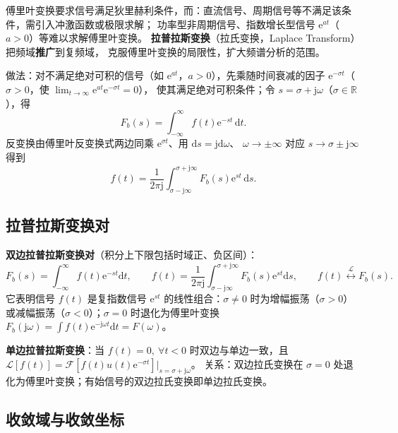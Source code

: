 傅里叶变换要求信号满足狄里赫利条件，而：直流信号、周期信号等不满足该条件，需引入冲激函数或极限求解；
功率型非周期信号、指数增长型信号 $\mathrm{e}^{at}$（$a>0$）等难以求解傅里叶变换。
\textbf{拉普拉斯变换}（拉氏变换，Laplace Transform）把频域\textbf{推广}到复频域，
克服傅里叶变换的局限性，扩大频谱分析的范围。

做法：对不满足绝对可积的信号（如 $\mathrm{e}^{at}$，$a>0$），先乘随时间衰减的因子
$\mathrm{e}^{-\sigma t}$（$\sigma>0$，使 $\lim_{t\to\infty}\mathrm{e}^{at}\mathrm{e}^{-\sigma t}=0$），
使其满足绝对可积条件；令 $s=\sigma+\mathrm{j}\omega$（$\sigma\in\mathbb{R}$），得
\begin{equation}
F_b(s)=\int_{-\infty}^{\infty}f(t)\mathrm{e}^{-st}\,\mathrm{d}t .
\end{equation}
反变换由傅里叶反变换式两边同乘 $\mathrm{e}^{\sigma t}$、用 $\mathrm{d}s=\mathrm{j}\mathrm{d}\omega$、
$\omega\to\pm\infty$ 对应 $s\to\sigma\pm\mathrm{j}\infty$ 得到
\begin{equation}
f(t)=\frac{1}{2\pi\mathrm{j}}\int_{\sigma-\mathrm{j}\infty}^{\sigma+\mathrm{j}\infty}F_b(s)\mathrm{e}^{st}\,\mathrm{d}s .
\end{equation}

\subsection{拉普拉斯变换对}

\textbf{双边拉普拉斯变换对}（积分上下限包括时域正、负区间）：
\begin{equation}
F_b(s)=\int_{-\infty}^{\infty}f(t)\mathrm{e}^{-st}\mathrm{d}t,\qquad
f(t)=\frac{1}{2\pi\mathrm{j}}\int_{\sigma-\mathrm{j}\infty}^{\sigma+\mathrm{j}\infty}F_b(s)\mathrm{e}^{st}\mathrm{d}s,
\qquad f(t)\overset{\mathcal{L}}{\longleftrightarrow}F_b(s).
\end{equation}
它表明信号 $f(t)$ 是复指数信号 $\mathrm{e}^{st}$ 的线性组合：$\sigma\neq0$ 时为增幅振荡（$\sigma>0$）
或减幅振荡（$\sigma<0$）；$\sigma=0$ 时退化为傅里叶变换
$F_b(\mathrm{j}\omega)=\int f(t)\mathrm{e}^{-\mathrm{j}\omega t}\mathrm{d}t=F(\omega)$。

\textbf{单边拉普拉斯变换}：当 $f(t)=0,\ \forall t<0$ 时双边与单边一致，且
$\mathcal{L}[f(t)]=\mathcal{F}[f(t)u(t)\mathrm{e}^{-\sigma t}]\big|_{s=\sigma+\mathrm{j}\omega}$。
关系：双边拉氏变换在 $\sigma=0$ 处退化为傅里叶变换；有始信号的双边拉氏变换即单边拉氏变换。

\subsection{收敛域与收敛坐标}

